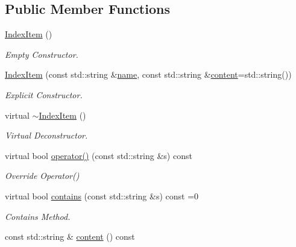 \subsection*{Public Member Functions}
\begin{DoxyCompactItemize}
\item 
\mbox{\label{class_index_item_aa37a5377a9cdd5993b09baad3d842a6f}} 
\hyperlink{class_index_item_aa37a5377a9cdd5993b09baad3d842a6f}{Index\+Item} ()
\begin{DoxyCompactList}\small\item\em Empty Constructor. \end{DoxyCompactList}\item 
\hyperlink{class_index_item_a9fcaaa46fb93a873ad73dc1ebdec8163}{Index\+Item} (const std\+::string \&\hyperlink{class_index_item_a059cbae312c51ae7d02050f8f325bf93}{name}, const std\+::string \&\hyperlink{class_index_item_aab7965cbd4a573ebf120ee6bad9a7fbf}{content}=std\+::string())
\begin{DoxyCompactList}\small\item\em Explicit Constructor. \end{DoxyCompactList}\item 
\mbox{\label{class_index_item_a38ee85d9f855b56d7bc591e3b3555f4c}} 
virtual \hyperlink{class_index_item_a38ee85d9f855b56d7bc591e3b3555f4c}{$\sim$\+Index\+Item} ()
\begin{DoxyCompactList}\small\item\em Virtual Deconstructor. \end{DoxyCompactList}\item 
virtual bool \hyperlink{class_index_item_a38ccc46639b8d0b066024bad728c1bfa}{operator()} (const std\+::string \&s) const
\begin{DoxyCompactList}\small\item\em Override Operator() \end{DoxyCompactList}\item 
virtual bool \hyperlink{class_index_item_a534d96bf041a485ed124663b9cded2fb}{contains} (const std\+::string \&s) const =0
\begin{DoxyCompactList}\small\item\em Contains Method. \end{DoxyCompactList}\item 
const std\+::string \& \hyperlink{class_index_item_aab7965cbd4a573ebf120ee6bad9a7fbf}{content} () const

\end{DoxyCompactItemize}
